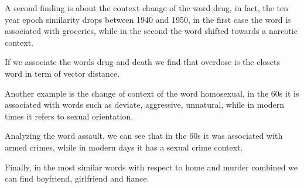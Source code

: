 A second finding is about the context change of the word drug, in fact, the ten year epoch similarity 
drops between 1940 and 1950, in the first case the word is associated with groceries, while in the 
second the word shifted towards a narcotic context.

If we associate the words drug and death we find that overdose is the closets word in term of vector distance.

Another example is the change of context of the word homosexual, in the 60s it is associated with words such as 
deviate, aggressive, unnatural, while in modern times it refers to sexual orientation.

Analyzing the word assault, we can see that in the 60s it was associated with armed crimes, 
while in modern days it has a sexual crime context. 

Finally, in the most similar words with respect to home and murder combined we can find boyfriend, girlfriend and fiance.